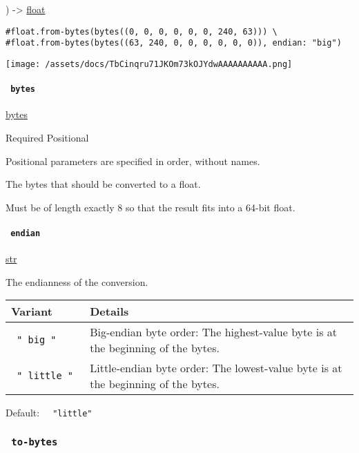 ) -\textgreater{} \href{/docs/reference/foundations/float/}{float}

\begin{verbatim}
#float.from-bytes(bytes((0, 0, 0, 0, 0, 0, 240, 63))) \
#float.from-bytes(bytes((63, 240, 0, 0, 0, 0, 0, 0)), endian: "big")
\end{verbatim}

\texttt{[image: /assets/docs/TbCinqru71JKOm73kOJYdwAAAAAAAAAA.png]}

\paragraph{\texorpdfstring{\texttt{\ bytes\ }}{ bytes }}\label{definitions-from-bytes-bytes}

\href{/docs/reference/foundations/bytes/}{bytes}

{Required} {{ Positional }}

\label{definitions-from-bytes-bytes-positional-tooltip}
Positional parameters are specified in order, without names.

The bytes that should be converted to a float.

Must be of length exactly 8 so that the result fits into a 64-bit float.

\paragraph{\texorpdfstring{\texttt{\ endian\ }}{ endian }}\label{definitions-from-bytes-endian}

\href{/docs/reference/foundations/str/}{str}

The endianness of the conversion.

\begin{longtable}[]{@{}ll@{}}
\toprule\noalign{}
Variant & Details \\
\midrule\noalign{}
\endhead
\bottomrule\noalign{}
\endlastfoot
\texttt{\ "\ big\ "\ } & Big-endian byte order: The highest-value byte
is at the beginning of the bytes. \\
\texttt{\ "\ little\ "\ } & Little-endian byte order: The lowest-value
byte is at the beginning of the bytes. \\
\end{longtable}

Default: \texttt{\ }{\texttt{\ "little"\ }}\texttt{\ }

\subsubsection{\texorpdfstring{\texttt{\ to-bytes\ }}{ to-bytes }}\label{definitions-to-bytes}

